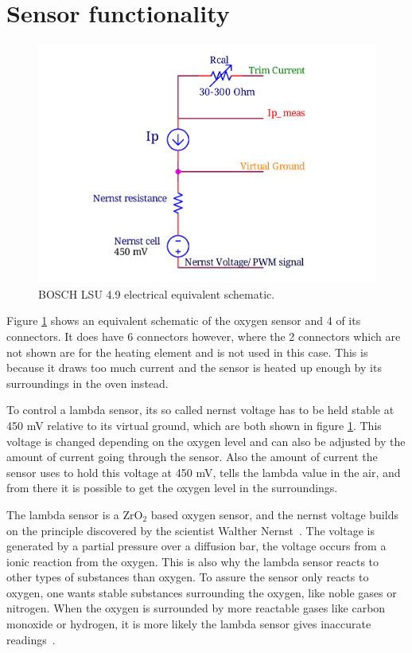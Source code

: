 \section{Sensor functionality}

\begin{figure}
    \centering
    \includegraphics[width = .6\textwidth]{Figures/SCHEMATIC1_lsu49.pdf}
    \caption{BOSCH LSU 4.9 electrical equivalent schematic.}
    \label{fig:schematic_lsu49}
\end{figure}

Figure \ref{fig:schematic_lsu49} shows an equivalent schematic of the oxygen sensor and 4 of its connectors. It does have 6 connectors however, where the 2 connectors which are not shown are for the heating element and is not used in this case. This is because it draws too much current and the sensor is heated up enough by its surroundings in the oven instead.

To control a lambda sensor, its so called nernst voltage has to be held stable at 450 mV relative to its virtual ground, which are both shown in figure \ref{fig:schematic_lsu49}. This voltage is changed depending on the oxygen level and can also be adjusted by the amount of current going through the sensor. Also the amount of current the sensor uses to hold this voltage at 450 mV, tells the lambda value in the air, and from there it is possible to get the oxygen level in the surroundings.


The lambda sensor is a ZrO$_2$ based oxygen sensor, and the nernst voltage builds on the principle discovered by the scientist Walther Nernst~\cite{Exhaust}. The voltage is generated by a partial pressure over a diffusion bar, the voltage occurs from a ionic reaction from the oxygen. This is also why the lambda sensor reacts to other types of substances than oxygen. To assure the sensor only reacts to oxygen, one wants stable substances surrounding the oxygen, like noble gases or nitrogen. When the oxygen is surrounded by more reactable gases like carbon monoxide or hydrogen, it is more likely the lambda sensor gives inaccurate readings~\cite{LSU49}.


